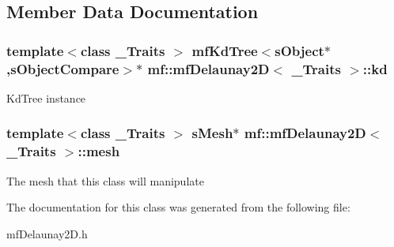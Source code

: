\subsection{Member Data Documentation}
\hypertarget{classmf_1_1mfDelaunay2D_aae51b27eea6af857950d06706393ca74}{
\subsubsection[{kd}]{\setlength{\rightskip}{0pt plus 5cm}template$<$class \_\-Traits $>$ {\bf mfKdTree}$<${\bf sObject}$\ast$,{\bf sObjectCompare}$>$$\ast$ {\bf mf::mfDelaunay2D}$<$ \_\-Traits $>$::{\bf kd}}}
\label{classmf_1_1mfDelaunay2D_aae51b27eea6af857950d06706393ca74}
KdTree instance \hypertarget{classmf_1_1mfDelaunay2D_a13c2a7b6100bae67ac768daaa5973089}{
\subsubsection[{mesh}]{\setlength{\rightskip}{0pt plus 5cm}template$<$class \_\-Traits $>$ {\bf sMesh}$\ast$ {\bf mf::mfDelaunay2D}$<$ \_\-Traits $>$::{\bf mesh}}}
\label{classmf_1_1mfDelaunay2D_a13c2a7b6100bae67ac768daaa5973089}
The mesh that this class will manipulate 

The documentation for this class was generated from the following file:\begin{DoxyCompactItemize}
\item 
mfDelaunay2D.h\end{DoxyCompactItemize}
